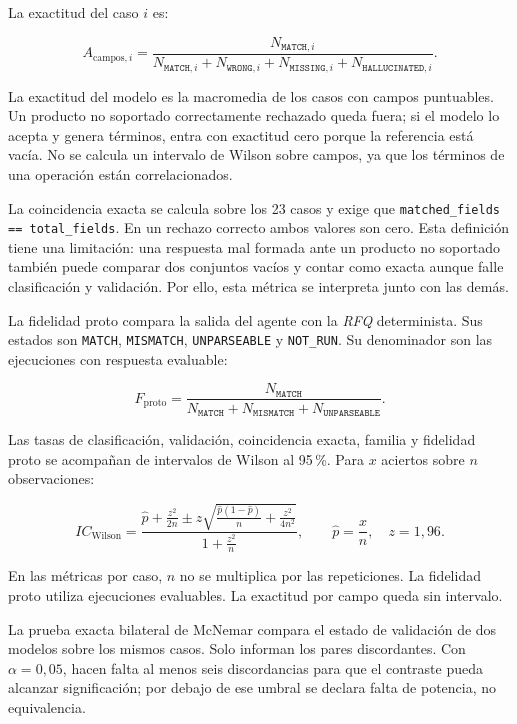 La exactitud del caso \(i\) es:

\begin{equation}
A_{\text{campos},i}
=
\frac{N_{\texttt{MATCH},i}}
{N_{\texttt{MATCH},i}+N_{\texttt{WRONG},i}+N_{\texttt{MISSING},i}+N_{\texttt{HALLUCINATED},i}}.
\end{equation}

La exactitud del modelo es la macromedia de los casos con campos puntuables. Un producto no soportado correctamente rechazado queda fuera; si el modelo lo acepta y genera términos, entra con exactitud cero porque la referencia está vacía. No se calcula un intervalo de Wilson sobre campos, ya que los términos de una operación están correlacionados.

La coincidencia exacta se calcula sobre los 23 casos y exige que \texttt{matched\_fields == total\_fields}. En un rechazo correcto ambos valores son cero. Esta definición tiene una limitación: una respuesta mal formada ante un producto no soportado también puede comparar dos conjuntos vacíos y contar como exacta aunque falle clasificación y validación. Por ello, esta métrica se interpreta junto con las demás.

La fidelidad proto compara la salida del agente con la \textit{RFQ} determinista. Sus estados son \texttt{MATCH}, \texttt{MISMATCH}, \texttt{UNPARSEABLE} y \texttt{NOT\_RUN}. Su denominador son las ejecuciones con respuesta evaluable:

\begin{equation}
F_{\text{proto}}
=
\frac{N_{\texttt{MATCH}}}
{N_{\texttt{MATCH}}+N_{\texttt{MISMATCH}}+N_{\texttt{UNPARSEABLE}}}.
\end{equation}

Las tasas de clasificación, validación, coincidencia exacta, familia y fidelidad proto se acompañan de intervalos de Wilson al 95\,\%. Para \(x\) aciertos sobre \(n\) observaciones:

\begin{equation}
IC_{\text{Wilson}}
=
\frac{\hat p+\frac{z^2}{2n}\pm z\sqrt{\frac{\hat p(1-\hat p)}{n}+\frac{z^2}{4n^2}}}{1+\frac{z^2}{n}},
\qquad \hat p=\frac{x}{n},\quad z=1{,}96.
\end{equation}

En las métricas por caso, \(n\) no se multiplica por las repeticiones. La fidelidad proto utiliza ejecuciones evaluables. La exactitud por campo queda sin intervalo.

La prueba exacta bilateral de McNemar compara el estado de validación de dos modelos sobre los mismos casos. Solo informan los pares discordantes. Con \(\alpha=0{,}05\), hacen falta al menos seis discordancias para que el contraste pueda alcanzar significación; por debajo de ese umbral se declara falta de potencia, no equivalencia.

